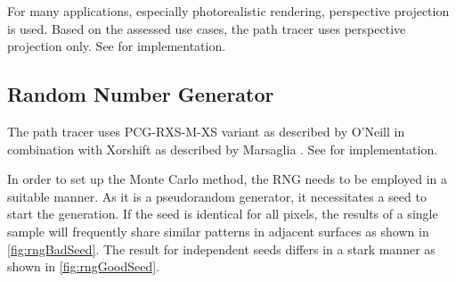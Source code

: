 For many applications, especially photorealistic rendering, perspective projection is used. Based on the assessed use cases, the path tracer uses perspective projection only. See  for implementation.

\subsection{Random Number Generator}

The path tracer uses PCG-RXS-M-XS variant as described by O’Neill \cite{o2014pcg} in combination with Xorshift as described by Marsaglia \cite{marsaglia2003xorshift}. See  for implementation.

In order to set up the Monte Carlo method, the \gls{RNG} needs to be employed in a suitable manner. As it is a pseudorandom generator, it necessitates a seed to start the generation. If the seed is identical for all pixels, the results of a single sample will frequently share similar patterns in adjacent surfaces as shown in \autoref{fig:rngBadSeed}. The result for independent seeds differs in a stark manner as shown in \autoref{fig:rngGoodSeed}.

